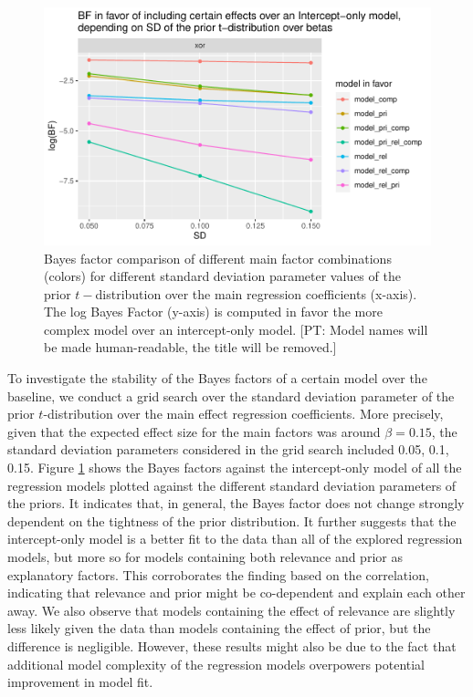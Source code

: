 \documentclass{sp}
\newcommand{\pt}[1]{\textcolor{Cerulean}{[PT: #1]}}
\begin{document}
\begin{figure}[h]
	\begin{center}
		\includegraphics[width=\linewidth]{images/BF_vs_SD_allModels_vs_int.pdf}
	\end{center}
	\vspace{-0.3cm}
	\caption{Bayes factor comparison of different main factor combinations (colors) for different standard deviation parameter values of the prior $t-$distribution over the main regression coefficients (x-axis). The log Bayes Factor (y-axis) is computed in favor the more complex model over an intercept-only model. \pt{Model names will be made human-readable, the title will be removed.}}
	\label{bf-grid-search}
\end{figure}

To investigate the stability of the Bayes factors of a certain model over the baseline, we conduct a grid search over the standard deviation parameter of the prior $t$-distribution over the main effect regression coefficients. More precisely, given that the expected effect size for the main factors was around $\beta=0.15$, the standard deviation parameters considered in the grid search included {0.05, 0.1, 0.15}. Figure \ref{bf-grid-search} shows the Bayes factors against the intercept-only model of all the regression models plotted against the different standard deviation parameters of the priors. It indicates that, in general, the Bayes factor does not change strongly dependent on the tightness of the prior distribution. It further suggests that the intercept-only model is a better fit to the data than all of the explored regression models, but more so for models containing both relevance and prior as explanatory factors. This corroborates the finding based on the correlation, indicating that relevance and prior might be co-dependent and explain each other away. We also observe that models containing the effect of relevance are slightly less likely given the data than models containing the effect of prior, but the difference is negligible. However, these results might also be due to the fact that additional model complexity of the regression models overpowers potential improvement in model fit.
\end{document}
